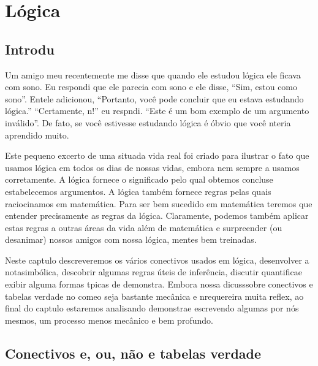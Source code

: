 \chapter{L\'ogica}
\section{Introdu\cao}\label{introducao}

Um amigo meu recentemente me disse que quando ele estudou l\'ogica ele ficava com sono. Eu respondi que ele parecia com sono e ele disse, ``Sim, estou como sono''. Ent\ao ele adicionou, ``Portanto, voc\^e pode concluir que eu estava estudando l\'ogica.'' ``Certamente, n\aoi!'' eu respndi. ``Este \'e um bom exemplo de um argumento inv\'alido''. De fato, se voc\^e estivesse estudando l\'ogica \'e \'obvio que voc\^e n\ao teria aprendido muito.

Este pequeno excerto de uma situa\cao da vida real  foi criado para ilustrar o fato que usamos l\'ogica em todos os dias de nossas vidas, embora nem sempre a usamos corretamente. A l\'ogica fornece o significado pelo qual obtemos conclus\oes e estabelecemos argumentos. A l\'ogica tamb\'em fornece regras pelas quais raciocinamos em matem\'atica. Para ser bem sucedido em matem\'atica teremos que entender precisamente as regras da l\'ogica. Claramente, podemos tamb\'em aplicar estas regras a outras \'areas da vida al\'em de matem\'atica e surpreender (ou desanimar) nossos amigos com nossa l\'ogica, mentes bem treinadas.

Neste cap\ih tulo descreveremos os v\'arios conectivos usados em l\'ogica, desenvolver a nota\cao simb\'olica, descobrir algumas regras \'uteis de infer\^encia, discutir quantifica\cao e exibir alguma formas t\ih picas de demonstra\caoi. Embora nossa dicuss\ao sobre conectivos e tabelas verdade no come\cc o seja bastante mec\^anica e n\ao requereira muita reflex\aoi, ao final do cap\ih tulo estaremos analisando demonstra\coes e escrevendo algumas por n\'os mesmos, um processo menos mec\^anico e bem profundo.

\section{Conectivos e, ou, n\~ao e tabelas verdade}\label{eounao}

